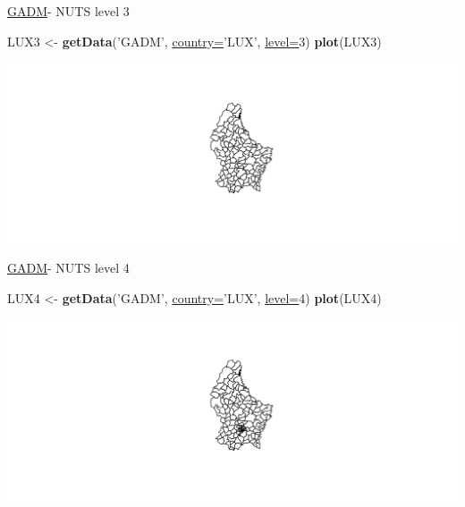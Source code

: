 \documentclass[ignorenonframetext,]{beamer}
\newenvironment{Shaded}{\begin{snugshade}}{\end{snugshade}}
\newcommand{\DataTypeTok}[1]{\textcolor[rgb]{0.74,0.68,0.62}{\underline{#1}}}
\newcommand{\DecValTok}[1]{\textcolor[rgb]{0.27,0.67,0.26}{#1}}
\newcommand{\KeywordTok}[1]{\textcolor[rgb]{0.26,0.66,0.93}{\textbf{#1}}}
\newcommand{\NormalTok}[1]{\textcolor[rgb]{0.74,0.68,0.62}{#1}}
\newcommand{\StringTok}[1]{\textcolor[rgb]{0.02,0.61,0.04}{#1}}
\begin{document}
\begin{frame}[fragile]{\href{http://www.gadm.org/}{GADM}- NUTS level 3}
\protect\hypertarget{gadm--nuts-level-3}{}

\begin{Shaded}
\begin{Highlighting}[]
\NormalTok{LUX3 <-}\StringTok{ }\KeywordTok{getData}\NormalTok{(}\StringTok{'GADM'}\NormalTok{, }\DataTypeTok{country=}\StringTok{'LUX'}\NormalTok{, }\DataTypeTok{level=}\DecValTok{3}\NormalTok{)}
\KeywordTok{plot}\NormalTok{(LUX3)}
\end{Highlighting}
\end{Shaded}

\includegraphics{Geomedizin_files/figure-beamer/LUX3-1.pdf}

\end{frame}

\begin{frame}[fragile]{\href{http://www.gadm.org/}{GADM}- NUTS level 4}
\protect\hypertarget{gadm--nuts-level-4}{}

\begin{Shaded}
\begin{Highlighting}[]
\NormalTok{LUX4 <-}\StringTok{ }\KeywordTok{getData}\NormalTok{(}\StringTok{'GADM'}\NormalTok{, }\DataTypeTok{country=}\StringTok{'LUX'}\NormalTok{, }\DataTypeTok{level=}\DecValTok{4}\NormalTok{)}
\KeywordTok{plot}\NormalTok{(LUX4)}
\end{Highlighting}
\end{Shaded}

\includegraphics{Geomedizin_files/figure-beamer/LUX4-1.pdf}

\end{frame}
\end{document}
